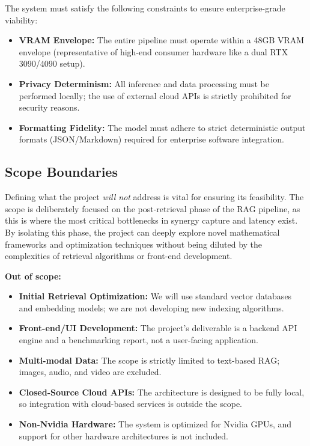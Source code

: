 The system must satisfy the following constraints to ensure enterprise-grade viability:
\begin{itemize}
    \item \textbf{VRAM Envelope:} The entire pipeline must operate within a 48GB VRAM envelope (representative of high-end consumer hardware like a dual RTX 3090/4090 setup).
    \item \textbf{Privacy Determinism:} All inference and data processing must be performed locally; the use of external cloud APIs is strictly prohibited for security reasons.
    \item \textbf{Formatting Fidelity:} The model must adhere to strict deterministic output formats (JSON/Markdown) required for enterprise software integration.
\end{itemize}


\subsection{Scope Boundaries}
\label{subsec:scope-boundaries}

Defining what the project \textit{will not} address is vital for ensuring its feasibility. The scope is deliberately focused on the post-retrieval phase of the RAG pipeline, as this is where the most critical bottlenecks in synergy capture and latency exist. By isolating this phase, the project can deeply explore novel mathematical frameworks and optimization techniques without being diluted by the complexities of retrieval algorithms or front-end development.

\textbf{Out of scope:}
\begin{itemize}
    \item \textbf{Initial Retrieval Optimization:} We will use standard vector databases and embedding models; we are not developing new indexing algorithms.
    \item \textbf{Front-end/UI Development:} The project's deliverable is a backend API engine and a benchmarking report, not a user-facing application.
    \item \textbf{Multi-modal Data:} The scope is strictly limited to text-based RAG; images, audio, and video are excluded.
    \item \textbf{Closed-Source Cloud APIs:} The architecture is designed to be fully local, so integration with cloud-based services is outside the scope.
    \item \textbf{Non-Nvidia Hardware:} The system is optimized for Nvidia GPUs, and support for other hardware architectures is not included.
\end{itemize}

